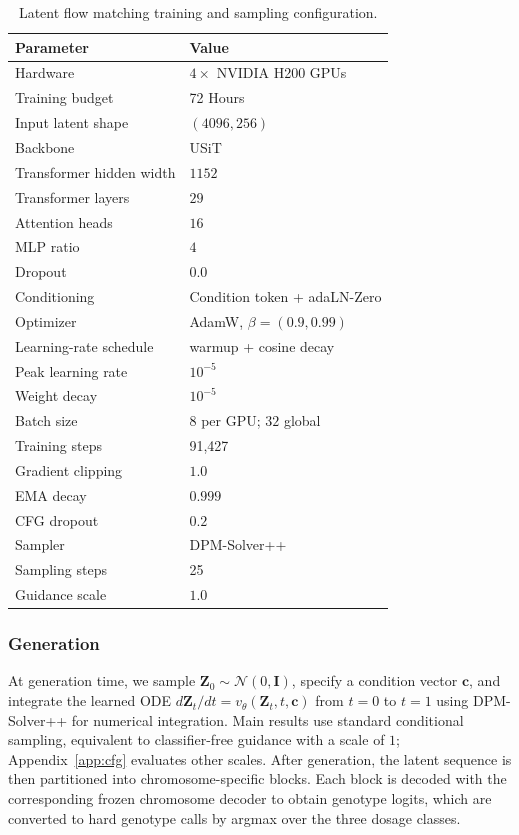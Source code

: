 \documentclass{article}
\begin{document}
\begin{table}[t]
\centering
\caption{Latent flow matching training and sampling configuration.}
\label{tab:flow_training}
\small
\setlength{\tabcolsep}{5pt}
\renewcommand{\arraystretch}{0.95}
\begin{tabular}{ll}
\toprule
Parameter & Value \\
\midrule
Hardware & \(4\times\) NVIDIA H200 GPUs \\
Training budget & 72 Hours \\
Input latent shape & \((4096,256)\) \\
Backbone & USiT \\
Transformer hidden width & \(1152\) \\
Transformer layers & \(29\) \\
Attention heads & \(16\) \\
MLP ratio & \(4\) \\
Dropout & \(0.0\) \\
Conditioning & Condition token + adaLN-Zero \\
Optimizer & AdamW, \(\beta=(0.9,0.99)\) \\
Learning-rate schedule & warmup + cosine decay \\
Peak learning rate & \(10^{-5}\) \\
Weight decay & \(10^{-5}\) \\
Batch size & \(8\) per GPU; \(32\) global  \\
Training steps & 91,427 \\
Gradient clipping & \(1.0\) \\
EMA decay & \(0.999\) \\
CFG dropout & \(0.2\) \\
Sampler & DPM-Solver++ \\
Sampling steps & 25 \\
Guidance scale & \(1.0\) \\
\bottomrule
\end{tabular}
\end{table}


\subsubsection{Generation}

At generation time, we sample
\(
\boldsymbol Z_0\sim \mathcal N(0,\boldsymbol I)
\), specify a condition vector \(\boldsymbol c\), and integrate the learned ODE
\(
d\boldsymbol Z_t/dt
=
v_\theta(\boldsymbol Z_t,t,\boldsymbol c)
\)
from \(t=0\) to \(t=1\) using DPM-Solver++ \cite{lu2025dpm} for numerical integration. Main results use standard conditional sampling, equivalent to classifier-free guidance \cite{ho2022classifier} with a scale of \(1\); Appendix~\ref{app:cfg} evaluates other scales. After generation, the latent sequence is then partitioned into chromosome-specific blocks. Each block is decoded with the corresponding frozen chromosome decoder to obtain genotype logits, which are converted to hard genotype calls by argmax over the three dosage classes. 
\end{document}
